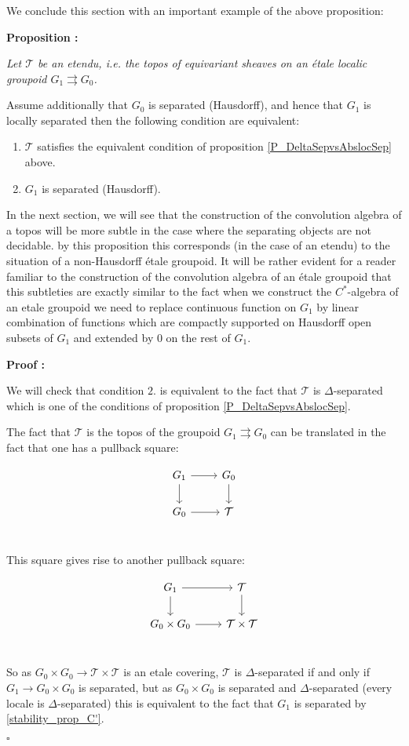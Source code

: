 \documentclass[a4paper]{article}
\newcommand{\Tcal}{\mathcal{T}}
\newcommand{\block}[1]
{

\par \subsubsection{} #1

\bigskip}
\newcommand{\Prop}[1]
	{

	\bigskip
	
	\textbf{Proposition : }{\itshape #1}
		
	\bigskip
	
	}
\newcommand{\Dem}[1]{
	
	\smallskip
	
	\textbf{Proof : } \par
	 {#1} $\square$
	 
	 \bigskip
}
\begin{document}
\block{We conclude this section with an important example of the above proposition:

\Prop{Let $\Tcal$ be an etendu, i.e. the topos of equivariant sheaves on an étale localic groupoid $G_1 \rightrightarrows G_0$.

Assume additionally that $G_0$ is separated (Hausdorff), and hence that $G_1$ is locally separated then the following condition are equivalent:


\begin{enumerate}

\item $\Tcal$ satisfies the equivalent condition of proposition \ref{P_DeltaSepvsAbslocSep} above.
\item $G_1$ is separated (Hausdorff).

\end{enumerate}

}

In the next section, we will see that the construction of the convolution algebra of a topos will be more subtle in the case where the separating objects are not decidable. by this proposition this corresponds (in the case of an etendu) to the situation of a non-Hausdorff étale groupoid. It will be rather evident for a reader familiar to the construction of the convolution algebra of an étale groupoid that this subtleties are exactly similar to the fact when we construct the $C^*$-algebra of an etale groupoid we need to replace continuous function on $G_1$ by linear combination of functions which are compactly supported on Hausdorff open subsets of $G_1$ and extended by $0$ on the rest of $G_1$.


\Dem{We will check that condition $2.$ is equivalent to the fact that $\Tcal$ is $\Delta$-separated which is one of the conditions of proposition \ref{P_DeltaSepvsAbslocSep}.

The fact that $\Tcal$ is the topos of the groupoid $G_1 \rightrightarrows G_0$ can be translated in the fact that one has a pullback square:

\[\begin{tikzcd}[ampersand replacement = \&]
G_1 \arrow{r} \arrow{d} \& G_0 \arrow{d} \\
G_0 \arrow{r} \& \Tcal \\
\end{tikzcd} \]

This square gives rise to another pullback square:

\[\begin{tikzcd}[ampersand replacement = \&]
G_1 \arrow{r} \arrow{d} \& \Tcal  \arrow{d} \\
G_0 \times G_0 \arrow{r} \& \Tcal \times \Tcal \\
\end{tikzcd} \]

So as $G_0 \times G_0 \rightarrow \Tcal \times \Tcal$ is an etale covering, $\Tcal$ is $\Delta$-separated if and only if $G_1 \rightarrow G_0 \times G_0$ is separated, but as $G_0 \times G_0$ is separated and $\Delta$-separated (every locale is $\Delta$-separated) this is equivalent to the fact that $G_1$ is separated by \ref{stability_prop_C'}.

}
}
\end{document}
